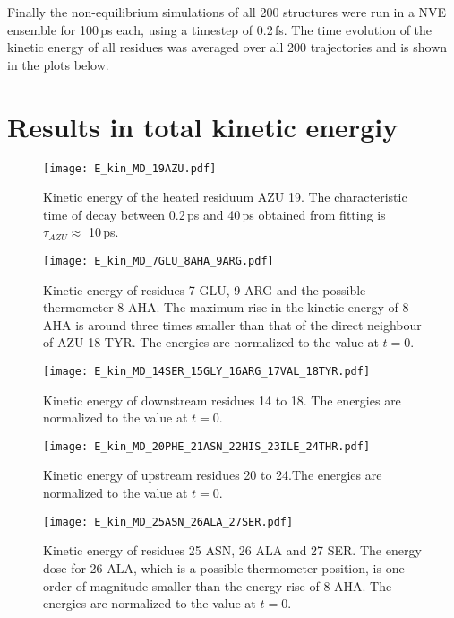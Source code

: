 \documentclass[11pt, a4paper]{report}
\begin{document}
Finally the non-equilibrium simulations of all 200 structures were run in a NVE ensemble for 100\,ps
each, using a timestep of 0.2\,fs. The time evolution of the kinetic energy of
all residues was averaged over all 200 trajectories and is shown in the plots
below.  

\section{Results in total kinetic energiy}
\begin{figure}[h]
  \centering
  \texttt{[image: E\_kin\_MD\_19AZU.pdf]}
  \caption{Kinetic energy of the heated residuum AZU 19. The characteristic time
    of decay between 0.2\,ps and 40\,ps obtained from fitting is $\tau_{AZU}
  \approx$ 10\,ps.}
  \label{fig:E_kin_MD_19}
\end{figure}

\begin{figure}[h]
  \centering
  \texttt{[image: E\_kin\_MD\_7GLU\_8AHA\_9ARG.pdf]}
  \caption{Kinetic energy of residues 7 GLU, 9 ARG and the possible thermometer
  8 AHA. The maximum rise in the kinetic energy of 8 AHA is around three times smaller
than that of the direct neighbour of AZU 18 TYR. The energies are normalized to the value at $t=0$. }
  \label{fig:E_kin_MEQ_9ARG_10MET_11SER_12ARG}
\end{figure}

\begin{figure}[h]
  \centering
  \texttt{[image: E\_kin\_MD\_14SER\_15GLY\_16ARG\_17VAL\_18TYR.pdf]}
  \caption{Kinetic energy of downstream residues 14 to 18. The energies are
  normalized to the value at $t=0$.}
  \label{fig:E_kin_MD_15_16_17_18}
\end{figure}

\begin{figure}[h]
  \centering
  \texttt{[image: E\_kin\_MD\_20PHE\_21ASN\_22HIS\_23ILE\_24THR.pdf]}
  \caption{Kinetic energy of upstream residues 20 to 24.The energies are normalized to the value at $t=0$.}
  \label{fig:E_kin_MD_20_21_22_23}
\end{figure}

\begin{figure}[h]
  \centering
  \texttt{[image: E\_kin\_MD\_25ASN\_26ALA\_27SER.pdf]}
  \caption{Kinetic energy of residues 25 ASN, 26 ALA and 27 SER. The energy
  dose for 26 ALA, which is a possible thermometer position, is one order of
magnitude smaller than the energy rise of 8 AHA. The energies are normalized to
the value at $t=0$.}
  \label{fig:name}
\end{figure}
\end{document}
